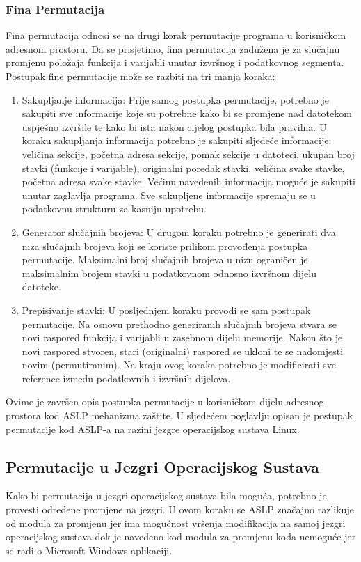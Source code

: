 \documentclass[times, utf8, diplomski, numeric]{fer}
\begin{document}
\subsubsection{Fina Permutacija}
Fina permutacija odnosi se na drugi korak permutacije programa u korisničkom adresnom prostoru. Da se prisjetimo, fina permutacija zadužena je za slučajnu promjenu položaja funkcija i varijabli unutar izvršnog i podatkovnog segmenta. Postupak fine permutacije može se razbiti na tri manja koraka:
\begin{enumerate}
\item Sakupljanje informacija: Prije samog postupka permutacije, potrebno je sakupiti sve informacije koje su potrebne kako bi se promjene nad datotekom uspješno izvršile te kako bi ista nakon cijelog postupka bila pravilna. U koraku sakupljanja informacija potrebno je sakupiti sljedeće informacije: veličina sekcije, početna adresa sekcije, pomak sekcije u datoteci, ukupan broj stavki (funkcije i varijable), originalni poredak stavki, veličina svake stavke, početna adresa svake stavke. Većinu navedenih informacija moguće je sakupiti unutar zaglavlja programa. Sve sakupljene informacije spremaju se u podatkovnu strukturu za kasniju upotrebu.
\item Generator slučajnih brojeva: U drugom koraku potrebno je generirati dva niza slučajnih brojeva koji se koriste prilikom provođenja postupka permutacije. Maksimalni broj slučajnih brojeva u nizu ograničen je maksimalnim brojem stavki u podatkovnom odnosno izvršnom dijelu datoteke.
\item Prepisivanje stavki: U posljednjem koraku provodi se sam postupak permutacije. Na osnovu prethodno generiranih slučajnih brojeva stvara se novi raspored funkcija i varijabli u zasebnom dijelu memorije. Nakon što je novi raspored stvoren, stari (originalni) raspored se ukloni te se nadomjesti novim (permutiranim). Na kraju ovog koraka potrebno je modificirati sve reference između podatkovnih i izvršnih dijelova.
\end{enumerate}
Ovime je završen opis postupka permutacije u korisničkom dijelu adresnog prostora kod ASLP mehanizma zaštite. U sljedećem poglavlju opisan je postupak permutacije kod ASLP-a na razini jezgre operacijskog sustava Linux.

\subsection{Permutacije u Jezgri Operacijskog Sustava}
Kako bi permutacija u jezgri operacijskog sustava bila moguća, potrebno je provesti određene promjene na jezgri. U ovom koraku se ASLP značajno razlikuje od modula za promjenu jer ima mogućnost vršenja modifikacija na samoj jezgri operacijskog sustava dok je navedeno kod modula za promjenu koda nemoguće jer se radi o Microsoft Windows aplikaciji.
\end{document}

